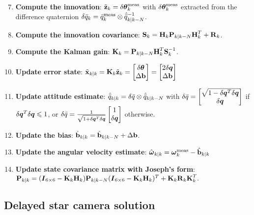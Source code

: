 \begin{enumerate}
\setcounter{enumi}{6}
\item \textbf{Compute the innovation}: $\tilde{\textrm{\textbf{z}}}_{k} =  \delta\boldsymbol\theta^\textrm{meas}_{k}$ with $\delta\boldsymbol\theta^\textrm{meas}_{k}$ extracted from the difference quaternion $\delta\bar{q}_{k} = \bar{q}^{\textrm{meas}}_{k} \otimes \hat{\bar{q}}^{-1}_{k|k-N}$. 
\item \textbf{Compute the innovation covariance}: $\textrm{\textbf{S}}_{k} = \textrm{\textbf{H}}_{k}\textrm{\textbf{P}}_{k|k-N}\textrm{\textbf{H}}^T_{k} + \textrm{\textbf{R}}_{k}$.
\item \textbf{Compute the Kalman gain}: $\textrm{\textbf{K}}_{k} = \textrm{\textbf{P}}_{k|k-N}\textrm{\textbf{H}}^T_{k}\textrm{\textbf{S}}^{-1}_{k}$.
\item \textbf{Update error state}: $\tilde{\textrm{\textbf{x}}}_{k|k} = \textrm{\textbf{K}}_{k} \tilde{\textrm{\textbf{z}}}_{k} = \begin{bmatrix} \delta\boldsymbol\theta \\ \Delta\textrm{\textbf{b}}\end{bmatrix} = \begin{bmatrix} 2\delta\boldsymbol{q} \\ \Delta\textrm{\textbf{b}}\end{bmatrix}$
\item \textbf{Update attitude estimate}: $\hat{\bar{q}}_{k|k} =\delta\bar{q}\otimes \hat{\bar{q}}_{k|k-N}$ with $\delta\bar{q} = \begin{bmatrix} \sqrt{1-\delta\boldsymbol{q}^T\delta\boldsymbol{q}} \\ \delta\boldsymbol{q}\end{bmatrix}$ if $\delta\boldsymbol{q}^T\delta\boldsymbol{q} \leqslant 1$, or $\delta\bar{q} = \frac{1}{\sqrt{1+\delta\boldsymbol{q}^T\delta\boldsymbol{q}}}\begin{bmatrix} 1 \\ \delta\boldsymbol{q} \end{bmatrix}$ otherwise.
\item \textbf{Update the bias}: $\hat{\textrm{\textbf{b}}}_{k|k} = \hat{\textrm{\textbf{b}}}_{k|k-N} + \Delta\textrm{\textbf{b}}$.
\item \textbf{Update the angular velocity estimate}: $\hat{\boldsymbol\omega}_{k|k} = \boldsymbol\omega_k^{\textrm{meas}} - \hat{\textrm{\textbf{b}}}_{k|k}$
\item \textbf{Update state covariance matrix with Joseph's form}: $\textrm{\textbf{P}}_{k|k} = (\boldsymbol{I}_{6\times 6} - \textrm{\textbf{K}}_{k}\textrm{\textbf{H}}_{k})\textrm{\textbf{P}}_{k|k-N}(\boldsymbol{I}_{6\times 6} - \textrm{\textbf{K}}_{k}\textrm{\textbf{H}}_{k})^T + \textrm{\textbf{K}}_{k}\textrm{\textbf{R}}_{k}\textrm{\textbf{K}}_{k}^T.$
\end{enumerate}

\subsection{Delayed star camera solution}
\label{subsec:delayed}

